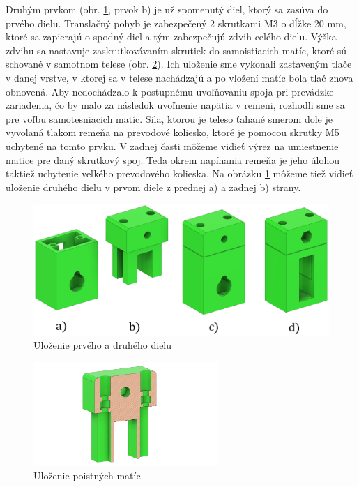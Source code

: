 Druhým prvkom (obr. \ref{OBRAZOK 2.5.2}, prvok b) je už spomenutý diel, ktorý sa zasúva do prvého dielu.  Translačný pohyb je zabezpečený 2 skrutkami M3 o dĺžke 20 mm, ktoré sa zapierajú o spodný diel a tým zabezpečujú zdvih celého dielu. Výška zdvihu sa nastavuje zaskrutkovávaním skrutiek do samoistiacich matíc, ktoré sú schované v samotnom telese (obr. \ref{OBRAZOK 2.5.3}). Ich uloženie sme vykonali zastaveným tlače v danej vrstve, v ktorej sa v telese nachádzajú a po vložení matíc bola tlač znova obnovená.  Aby nedochádzalo k postupnému uvoľňovaniu spoja pri prevádzke zariadenia, čo by malo za následok uvoľnenie napätia v remeni, rozhodli sme sa pre voľbu samotesniacich matíc. Sila, ktorou je teleso ťahané smerom dole je vyvolaná tlakom remeňa na prevodové koliesko, ktoré je pomocou skrutky M5 uchytené na tomto prvku. V zadnej časti môžeme vidieť výrez na umiestnenie matice pre daný skrutkový spoj. Teda okrem napínania remeňa je jeho úlohou taktiež uchytenie veľkého prevodového kolieska. Na obrázku \ref{OBRAZOK 2.5.2} môžeme tiež vidieť uloženie druhého dielu v prvom diele z prednej a) a zadnej b) strany.  

\begin{figure}[]
	\centering
	\includegraphics[width=150mm]{obr/3Dbase.eps}
	\caption{Uloženie prvého a druhého dielu}\label{OBRAZOK 2.5.2} 
\end{figure} 

\begin{figure}[]
	\centering
	\includegraphics[width=70mm]{obr/3Dprvok2.png}
	\caption{Uloženie poistných matíc}\label{OBRAZOK 2.5.3} 
\end{figure} 

